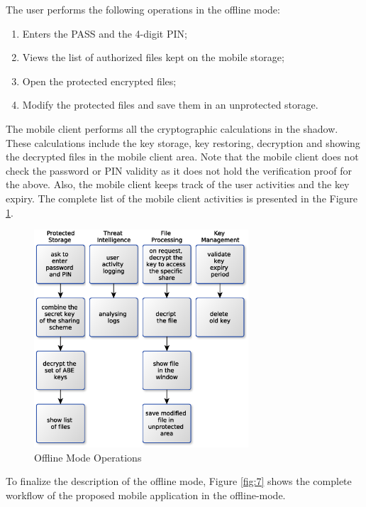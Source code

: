 \documentclass[twocolumn]{svjour3}          	%
\begin{document}
The user performs the following operations in the offline mode:

\begin{enumerate}
	\item Enters the PASS and the 4-digit PIN;
	\item Views the list of authorized files kept on the mobile storage;
	\item Open the protected encrypted files;
	\item Modify the protected files and save them in an unprotected storage.
\end{enumerate}

The mobile client performs all the cryptographic calculations in the shadow. These calculations include the key storage, key restoring, decryption and showing the decrypted files in the mobile client area. Note that the mobile client does not check the password or PIN validity as it does not hold the verification proof for the above. Also, the mobile client keeps track of the user activities and the key expiry. The complete list of the mobile client activities is presented in the Figure \ref{fig:6}.

\begin{figure}[h!]
	\centering
	\includegraphics[width=8cm]{figures/offlinemodeoperations.eps}
	\caption{Offline Mode Operations}
	\label{fig:6}
\end{figure}

To finalize the description of the offline mode, Figure \ref{fig:7} shows the complete workflow of the proposed mobile application in the offline-mode.
\end{document}
